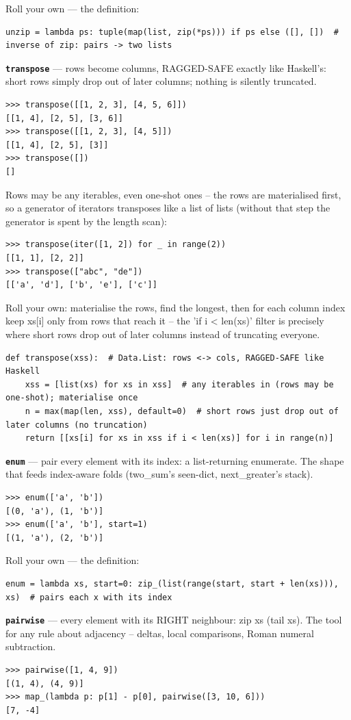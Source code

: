 \documentclass[10pt,letterpaper]{article}
\begin{document}
Roll your own --- the definition:

\begin{lstlisting}[style=ex]
unzip = lambda ps: tuple(map(list, zip(*ps))) if ps else ([], [])  # inverse of zip: pairs -> two lists
\end{lstlisting}
\textbf{\texttt{transpose}} --- rows become columns, RAGGED-SAFE exactly like Haskell's: short rows simply drop out of later columns; nothing is silently truncated.
\begin{lstlisting}[style=ex]
>>> transpose([[1, 2, 3], [4, 5, 6]])
[[1, 4], [2, 5], [3, 6]]
>>> transpose([[1, 2, 3], [4, 5]])
[[1, 4], [2, 5], [3]]
>>> transpose([])
[]
\end{lstlisting}

Rows may be any iterables, even one-shot ones -- the rows are materialised first, so a generator of iterators transposes like a list of lists (without that step the generator is spent by the length scan):

\begin{lstlisting}[style=ex]
>>> transpose(iter([1, 2]) for _ in range(2))
[[1, 1], [2, 2]]
>>> transpose(["abc", "de"])
[['a', 'd'], ['b', 'e'], ['c']]
\end{lstlisting}

Roll your own: materialise the rows, find the longest, then for each column index keep xs[i] only from rows that reach it -- the 'if i < len(xs)' filter is precisely where short rows drop out of later columns instead of truncating everyone.

\begin{lstlisting}[style=ex]
def transpose(xss):  # Data.List: rows <-> cols, RAGGED-SAFE like Haskell
    xss = [list(xs) for xs in xss]  # any iterables in (rows may be one-shot); materialise once
    n = max(map(len, xss), default=0)  # short rows just drop out of later columns (no truncation)
    return [[xs[i] for xs in xss if i < len(xs)] for i in range(n)]
\end{lstlisting}
\textbf{\texttt{enum}} --- pair every element with its index: a list-returning enumerate. The shape that feeds index-aware folds (two\_sum's seen-dict, next\_greater's stack).
\begin{lstlisting}[style=ex]
>>> enum(['a', 'b'])
[(0, 'a'), (1, 'b')]
>>> enum(['a', 'b'], start=1)
[(1, 'a'), (2, 'b')]
\end{lstlisting}

Roll your own --- the definition:

\begin{lstlisting}[style=ex]
enum = lambda xs, start=0: zip_(list(range(start, start + len(xs))), xs)  # pairs each x with its index
\end{lstlisting}
\textbf{\texttt{pairwise}} --- every element with its RIGHT neighbour: zip xs (tail xs). The tool for any rule about adjacency -- deltas, local comparisons, Roman numeral subtraction.
\begin{lstlisting}[style=ex]
>>> pairwise([1, 4, 9])
[(1, 4), (4, 9)]
>>> map_(lambda p: p[1] - p[0], pairwise([3, 10, 6]))
[7, -4]
\end{lstlisting}
\end{document}
